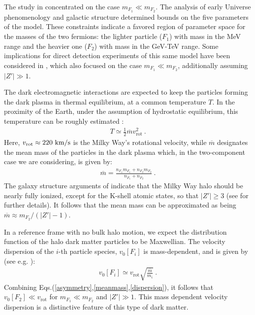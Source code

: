 \documentclass[12pt]{article}
\begin{document}
The study in \cite{dhsdm} concentrated on the case $m _{F_1} \ll m _{F_2}$. The analysis of early Universe phenomenology and galactic structure determined bounds on the five parameters of the model. These constraints indicate a favored region of parameter space for the masses of the two fermions: the lighter particle ($F_1$) with mass in the MeV range and the heavier one ($F_2$) with mass in the GeV-TeV range. Some implications for direct detection experiments of this same model have been considered in \cite{hiddensector}, which also focused on the case $m _{F_1} \ll m _{F_2}$, additionally assuming $|Z'| \gg 1$.

The dark electromagnetic interactions are expected to keep the particles forming the dark plasma in thermal equilibrium, at a common temperature $T$. In the proximity of the Earth, under the assumption of hydrostatic equilibrium, this temperature can be roughly estimated \cite{hiddensector}:
%
\begin{eqnarray}
T \simeq \frac{1}{2}\overline{m}v _{\text{rot}} ^2 \ .
\end{eqnarray}
%
Here, $v _{\text{rot}} \approx 220 \ \rm km/s$ is the Milky Way's rotational velocity, while $\overline{m}$ designates the mean mass of the particles in the dark plasma which, in the two-component case we are considering, is given by:
%
\begin{eqnarray}
\overline{m} = \frac{n _{F_1}m _{F_1} + n _{F_2}m _{F_2}}{n _{F_1} + n _{F_2}} \ .
\label{meanmass}
\end{eqnarray}
%
The galaxy structure arguments of \cite{dhsdm} indicate that the Milky Way halo should be nearly fully ionized, except for the K-shell atomic states, so that $|Z'| \geq 3$ (see \cite{dhsdm} for further details). It follows that the mean mass can be approximated as being $\overline{m} \approx m _{F_2}/(|Z'|-1)$.

In a reference frame with no bulk halo motion, we expect the distribution function of the halo dark matter particles to be Maxwellian. The velocity dispersion of the $i$-th particle species, $v _0[F _i]$ is mass-dependent, and is given by (see e.g. \cite{hiddensector}):
%
\begin{eqnarray}
v _0[F _i] \simeq v _{\text{rot}}\sqrt{\frac{\overline{m}}{m _i}} \ .
\label{dispersion}
\end{eqnarray}
%
Combining Eqs.(\ref{asymmetry},\ref{meanmass},\ref{dispersion}), it follows that $v _0[F _2] \ll v _{\text{rot}}$ for $m _{F_1} \ll m _{F_2}$ and $|Z'| \gg 1$. This mass dependent velocity dispersion is a distinctive feature of this type of dark matter.
\end{document}
